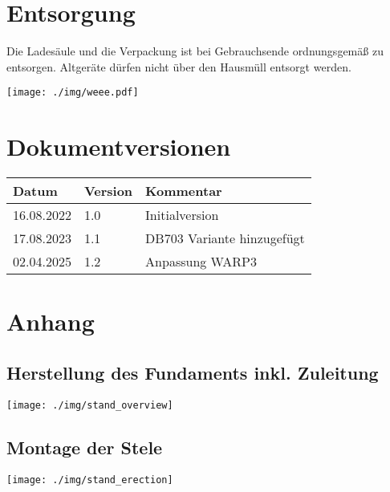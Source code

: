 \documentclass[a4paper,10pt]{article}
\begin{document}
\begin{multicols*}{2}
	\section{Entsorgung}
	\begin{minipage}{0.40\textwidth}
		Die Ladesäule und die Verpackung ist bei Gebrauchsende ordnungsgemäß zu
		entsorgen. Altgeräte dürfen nicht über den Hausmüll entsorgt werden.
	\end{minipage}\hfill
	\begin{minipage}{0.07\textwidth}
		\texttt{[image: ./img/weee.pdf]}
	\end{minipage}

	\section{Dokumentversionen}
	\begin{tabular}{lll}
		\toprule
		Datum      & Version & Kommentar                   \\
		\midrule
		16.08.2022 & 1.0     & Initialversion              \\
		17.08.2023 & 1.1     & DB703 Variante hinzugefügt    \\
        02.04.2025 & 1.2     & Anpassung WARP3    \\
		\bottomrule
	\end{tabular}

	\end{multicols*}
	\pagestyle{empty}
	\newpage
	\null
	\newpage
	\newpage
	\null
	\newpage
	\pagestyle{fancy}
	\section*{Anhang}

	\subsection*{Herstellung des Fundaments inkl. Zuleitung}
	\label{appendix_base}
	\begin{center}
		\texttt{[image: ./img/stand\_overview]}
	\end{center}

	\subsection*{Montage der Stele}
	\label{appendix_erection}
	\begin{center}
		\texttt{[image: ./img/stand\_erection]}
	\end{center}
\end{document}
